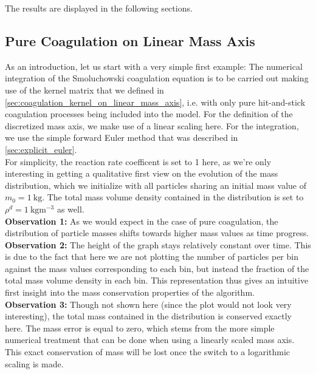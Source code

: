     The results are displayed in the following sections.

    \subsection{Pure Coagulation on Linear Mass Axis}

        As an introduction, let us start with a very simple first example: The numerical 
        integration of the Smoluchowski coagulation equation is to be carried out making 
        use of the kernel matrix that we defined in 
        \cref{sec:coagulation_kernel_on_linear_mass_axis}, i.e. with only pure 
        hit-and-stick coagulation processes being included into the model.
        For the definition of the discretized mass axis, we make use of a linear scaling 
        here. For the integration, we use the simple forward Euler method that was 
        described in \cref{sec:explicit_euler}. \\

        For simplicity, the reaction rate coefficent is set to 1 here, as we're only 
        interesting in getting a qualitative first view on the evolution of the 
        mass distribution, which we initialize with all particles sharing an initial mass 
        value of $m_0 = 1\ \text{kg}$. The total mass volume density contained in the 
        distribution is set to $\rho^d=1\ \text{kg} \text{m}^{-3}$ as well. \\

        \textbf{Observation 1:} As we would expect in the case of pure coagulation, the
        distribution of particle masses shifts towards higher mass values as time progress. \\

        \textbf{Observation 2:} The height of the graph stays relatively constant over time. 
        This is due to the fact that here we are not plotting the number of particles per bin 
        against the mass values corresponding to each bin, but instead the fraction of the 
        total mass volume density in each bin. This representation thus gives an intuitive 
        first insight into the mass conservation properties of the algorithm. \\

        \textbf{Observation 3:} Though not shown here (since the plot would not look very
        interesting), the total mass contained in the distribution is conserved exactly here.
        The mass error is equal to zero, which stems from the more simple numerical 
        treatment that can be done when using a linearly scaled mass axis. This exact conservation 
        of mass will be lost once the switch to a logarithmic scaling is made. \\

